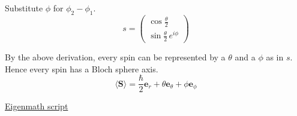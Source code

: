 Substitute $\phi$ for $\phi_2-\phi_1$.
\begin{equation*}
s=\begin{pmatrix}
\cos\frac{\theta}{2}
\\[1ex]
\sin\frac{\theta}{2}\,e^{i\phi}
\end{pmatrix}
\end{equation*}

By the above derivation, every spin can be represented by a $\theta$ and a $\phi$ as in $s$.
Hence every spin has a Bloch sphere axis.
\begin{equation*}
\langle\mathbf S\rangle=\frac{\hbar}{2}\mathbf e_r+\theta\mathbf e_\theta+\phi\mathbf e_\phi
\end{equation*}

\href{https://georgeweigt.github.io/examples/bloch-sphere-2-demo.html}{Eigenmath script}


